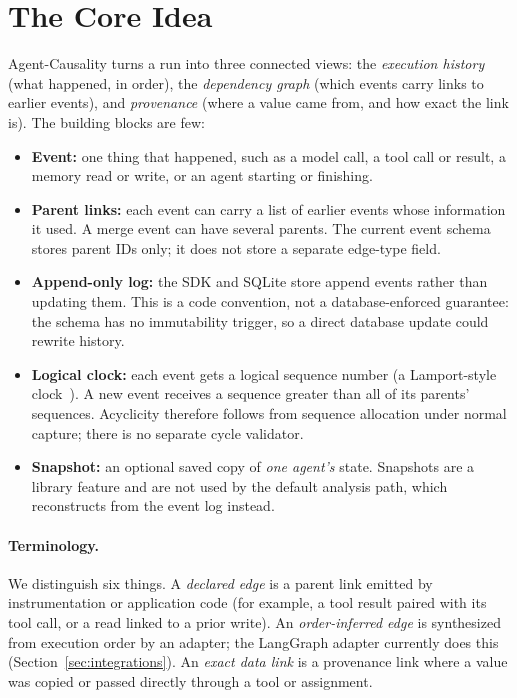 \documentclass[11pt]{article}
\begin{document}
\section{The Core Idea}\label{sec:idea}
Agent-Causality turns a run into three connected views: the \emph{execution history} (what happened, in order), the \emph{dependency graph} (which events carry links to earlier events), and \emph{provenance} (where a value came from, and how exact the link is). The building blocks are few:
\begin{itemize}
\item \textbf{Event:} one thing that happened, such as a model call, a tool call or result, a memory read or write, or an agent starting or finishing.
\item \textbf{Parent links:} each event can carry a list of earlier events whose information it used. A merge event can have several parents. The current event schema stores parent IDs only; it does not store a separate edge-type field.
\item \textbf{Append-only log:} the SDK and SQLite store append events rather than updating them. This is a code convention, not a database-enforced guarantee: the schema has no immutability trigger, so a direct database update could rewrite history.
\item \textbf{Logical clock:} each event gets a logical sequence number (a Lamport-style clock~\cite{lamport1978}). A new event receives a sequence greater than all of its parents' sequences. Acyclicity therefore follows from sequence allocation under normal capture; there is no separate cycle validator.
\item \textbf{Snapshot:} an optional saved copy of \emph{one agent's} state. Snapshots are a library feature and are not used by the default analysis path, which reconstructs from the event log instead.
\end{itemize}

\paragraph{Terminology.} We distinguish six things. A \emph{declared edge} is a parent link emitted by instrumentation or application code (for example, a tool result paired with its tool call, or a read linked to a prior write). An \emph{order-inferred edge} is synthesized from execution order by an adapter; the LangGraph adapter currently does this (Section~\ref{sec:integrations}). An \emph{exact data link} is a provenance link where a value was copied or passed directly through a tool or assignment. 
\end{document}
